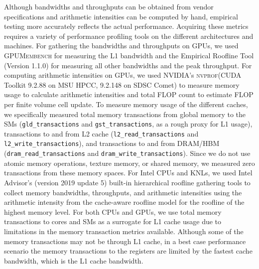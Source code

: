\documentclass[10pt,journal,compsoc]{IEEEtran}
\newcommand{\textcode}[1]{\textsc{#1}}
\newcommand{\gpumembench}{\textcode{GPUMembench}\xspace}
\newcommand{\nvprof}{\textcode{nvprof}\xspace}
\begin{document}
Although bandwidths and throughputs can be obtained
from vendor specifications and arithmetic intensities can be
computed by hand, empirical testing more accurately reflects the actual
performance. Acquiring these metrics requires a variety  of
performance profiling tools on the different architectures and machines. For
gathering the bandwidths and throughputs on GPUs, we used \gpumembench
\cite{konstantinidis_quantitative_2017} for measuring the L1 bandwidth and the
Empirical Roofline Tool (Version 1.1.0) \cite{lo_roofline_toolkit_2015}
for measuring all other bandwidths and the peak throughput.  For computing
arithmetic intensities on GPUs, we used NVIDIA's \nvprof (CUDA Toolkit
9.2.88 on MSU HPCC, 9.2.148 on SDSC Comet) to measure memory usage to
calculate arithmetic intensities and total FLOP count to estimate FLOP per
finite volume cell update. To measure memory usage of the different caches, we
specifically measured total memory transactions from global memory to the SMs
(\texttt{gld\_transactions} and \texttt{gst\_transactions}, as a rough proxy
for L1 usage), transactions to and from L2 cache
(\texttt{l2\_read\_transactions} and \texttt{l2\_write\_transactions}), and
transactions to and from DRAM/HBM (\texttt{dram\_read\_transactions} and
\texttt{dram\_write\_transactions}). Since we do not use atomic memory
operations, texture memory, or shared memory, we measured zero transactions
from these memory spaces.  For Intel CPUs and KNLs, we used Intel Advisor's
(version 2019 update 5) built-in hierarchical roofline gathering tools to
collect memory bandwidths, throughputs, and arithmetic intensities
\cite{intel_advisor_roofline} using the arithmetic intensity from the
cache-aware roofline model for the roofline of the highest memory level.  For
both CPUs and GPUs, we use total memory transactions to cores and SMs as a
surrogate for L1 cache usage due to limitations in the memory transaction
metrics available. Although some of the memory transactions may not be through
L1 cache, in a best case performance scenario the memory transactions to the
registers are limited by the fastest cache bandwidth, which is the L1 cache
bandwidth.
\end{document}
